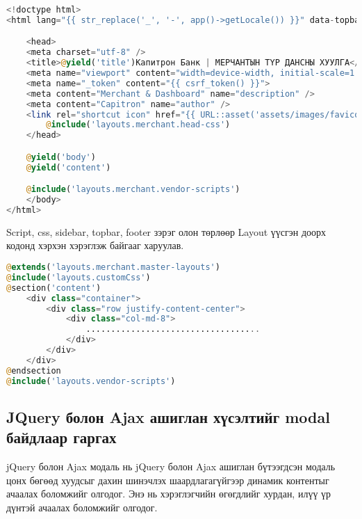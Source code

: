 \begin{lstlisting}[language=Php, caption=Layout үүсгэсэн байдал, frame=single]
<!doctype html>
<html lang="{{ str_replace('_', '-', app()->getLocale()) }}" data-topbar="light" data-sidebar-image="none">

    <head>
    <meta charset="utf-8" />
    <title>@yield('title')Капитрон Банк | МЕРЧАНТЫН ТҮР ДАНСНЫ ХУУЛГА</title>
    <meta name="viewport" content="width=device-width, initial-scale=1.0">
    <meta name="_token" content="{{ csrf_token() }}">
    <meta content="Merchant & Dashboard" name="description" />
    <meta content="Capitron" name="author" />
    <link rel="shortcut icon" href="{{ URL::asset('assets/images/favicon.ico')}}">
        @include('layouts.merchant.head-css')
    </head>

    @yield('body')
    @yield('content')

    @include('layouts.merchant.vendor-scripts')
    </body>
</html>

\end{lstlisting}

 Script, css, sidebar, topbar, footer зэрэг олон төрлөөр Layout үүсгэн доорх кодонд хэрхэн хэрэглэж байгааг харуулав. 

\begin{lstlisting}[language=Php, caption=Үүсгэсэн Layout-аа ашигласан байдал, frame=single]
@extends('layouts.merchant.master-layouts')
@include('layouts.customCss')
@section('content')
    <div class="container">
        <div class="row justify-content-center">
            <div class="col-md-8">
                ...................................
            </div>
        </div>
    </div>
@endsection
@include('layouts.vendor-scripts')
\end{lstlisting}
\pagebreak

\subsection{JQuery болон Ajax ашиглан хүсэлтийг modal байдлаар гаргах}

jQuery болон Ajax модаль нь jQuery болон Ajax ашиглан бүтээгдсэн модаль цонх бөгөөд хуудсыг дахин шинэчлэх шаардлагагүйгээр динамик контентыг ачаалах боломжийг олгодог. Энэ нь хэрэглэгчийн өгөгдлийг хурдан, илүү үр дүнтэй ачаалах боломжийг олгодог.

